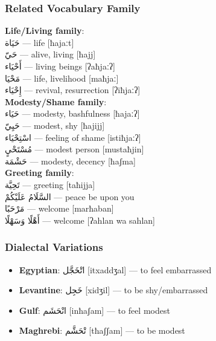 \documentclass[letterpaper,12pt]{article}
\begin{document}
\subsubsection*{Related Vocabulary Family}
\begin{multicols}{2}
\textbf{Life/Living family}:\\
\textarabic{حَيَاة} — life [ħajaːt]\\
\textarabic{حَيّ} — alive, living [ħajj]\\
\textarabic{أَحْيَاء} — living beings [ʔaħjaːʔ]\\
\textarabic{مَحْيَا} — life, livelihood [maħjaː]\\
\textarabic{إِحْيَاء} — revival, resurrection [ʔiħjaːʔ]\\

\textbf{Modesty/Shame family}:\\
\textarabic{حَيَاء} — modesty, bashfulness [ħajaːʔ]\\
\textarabic{حَيِيّ} — modest, shy [ħajijj]\\
\textarabic{اسْتِحْيَاء} — feeling of shame [istiħjaːʔ]\\
\textarabic{مُسْتَحْيٍ} — modest person [mustaħjin]\\
\textarabic{حَشْمَة} — modesty, decency [ħaʃma]\\

\textbf{Greeting family}:\\
\textarabic{تَحِيَّة} — greeting [taħijja]\\
\textarabic{السَّلَامُ عَلَيْكُمْ} — peace be upon you\\
\textarabic{مَرْحَبًا} — welcome [marħaban]\\
\textarabic{أَهْلًا وَسَهْلًا} — welcome [ʔahlan wa sahlan]\\
\end{multicols}

\subsubsection*{Dialectal Variations}
\begin{itemize}
  \item \textbf{Egyptian}: \textarabic{اتْخَجَّل} [itxaddʒal] — to feel embarrassed
  \item \textbf{Levantine}: \textarabic{خَجِل} [xidʒil] — to be shy/embarrassed  
  \item \textbf{Gulf}: \textarabic{انْحَشَم} [inħaʃam] — to feel modest
  \item \textbf{Maghrebi}: \textarabic{تْحَشَّم} [tħaʃʃam] — to be modest
\end{itemize}
\end{document}
